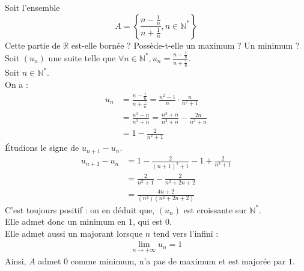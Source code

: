 \documentclass[11pt]{article}
\begin{document}
\begin{exercice}{}{}
    Soit l'ensemble 
    \begin{equation*}
        A = \left\{\frac{ n-\frac{1}{n} }{ n+\frac{1}{n}}, n\in\mathbb{N}^* \right\}
    \end{equation*}
    Cette partie de $\mathbb{R}$ est-elle bornée ? Possède-t-elle un maximum ? Un minimum ?
    \tcblower
    Soit $(u_n)$ une suite telle que $\forall{n\in\mathbb{N}^*}, u_n=\frac{n-\frac{1}{n}}{n+\frac{1}{n}}$.\\
    Soit $n\in\mathbb{N}^*$.\\
    On a :
    \begin{align*}
        u_n 
        &= \frac{n-\frac{1}{n}}{n+\frac{1}{n}} = \frac{n^2-1}{n} \cdot \frac{n}{n^2+1}\\
        &= \frac{n^3-n}{n^3+n} = \frac{n^3+n}{n^3+n}-\frac{2n}{n^3+n}\\
        &= 1 - \frac{2}{n^2+1}
    \end{align*}
    Étudions le signe de $u_{n+1}-u_n$.
    \begin{align*}
        u_{n+1}-u_n
        &= 1 - \frac{2}{(n+1)^2+1}-1+\frac{2}{n^2+1}\\
        &= \frac{2}{n^2+1} - \frac{2}{n^2+2n+2}\\
        &= \frac{4n+2}{(n^2)(n^2+2n+2)}
    \end{align*}
    C'est toujours positif : on en déduit que, $(u_n)$ est croissante sur $\mathbb{N}^*$.\\
    Elle admet donc un minimum en $1$, qui est $0$.\\
    Elle admet aussi un majorant lorsque $n$ tend vers l'infini :
    \begin{align*}
        \lim_{n\rightarrow+\infty}u_n=1
    \end{align*}
    Ainsi, $A$ admet $0$ comme minimum, n'a pas de maximum et est majorée par $1$.
\end{exercice}
\end{document}
